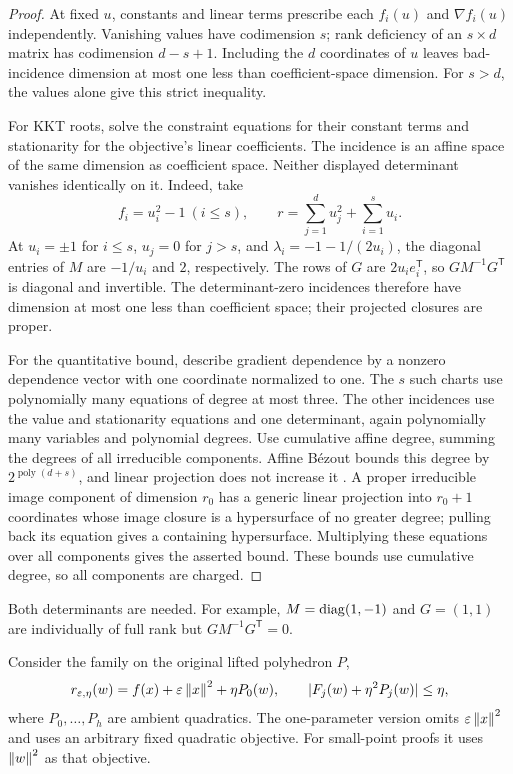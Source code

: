 \begin{proof}
At fixed $u$, constants and linear terms prescribe each $f_i(u)$ and
$\nabla f_i(u)$ independently. Vanishing values have codimension $s$;
rank deficiency of an $s\times d$ matrix has codimension $d-s+1$.
Including the $d$ coordinates of $u$ leaves bad-incidence dimension at most
one less than coefficient-space dimension. For $s>d$, the values alone
give this strict inequality.

For KKT roots, solve the constraint equations for their constant terms and
stationarity for the objective's linear coefficients. The incidence is an
affine space of the same dimension as coefficient space. Neither displayed
determinant vanishes identically on it. Indeed, take
\[
 f_i=u_i^2-1\ (i\le s),\qquad
 r=\sum_{j=1}^du_j^2+\sum_{i=1}^su_i.
\]
At $u_i=\pm1$ for $i\le s$, $u_j=0$ for $j>s$, and
$\lambda_i=-1-1/(2u_i)$, the diagonal entries of $M$ are $-1/u_i$ and
$2$, respectively. The rows of $G$ are $2u_ie_i^{\mathsf T}$, so
$GM^{-1}G^{\mathsf T}$ is diagonal and invertible. The determinant-zero
incidences therefore have dimension at most one less than coefficient
space; their projected closures are proper.

For the quantitative bound, describe gradient dependence by a nonzero
dependence vector with one coordinate normalized to one. The $s$ such
charts use polynomially many equations of degree at most three. The other
incidences use the value and stationarity equations and one determinant,
again polynomially many variables and polynomial degrees. Use cumulative
affine degree, summing the degrees of all irreducible components. Affine
B\'ezout bounds this degree by $2^{\operatorname{poly}(d+s)}$, and linear
projection does not increase it
\cite[Section~1.2.1]{KrickPardoSombra2001}. A proper irreducible image
component of dimension $r_0$ has a generic linear projection into $r_0+1$
coordinates whose image closure is a hypersurface of no greater degree;
pulling back its equation gives a containing hypersurface. Multiplying
these equations over all components gives the asserted bound. These bounds
use cumulative degree, so all components are charged.
\end{proof}

Both determinants are needed. For example, $M=\operatorname{diag}(1,-1)$ and $G=(1,1)$
are individually of full rank but $GM^{-1}G^{\mathsf T}=0$.

Consider the family on the original lifted polyhedron $P$,
\begin{equation}
\label{eq:ncq-perturbation}
 r_{\varepsilon,\eta}(w)=f(x)+\varepsilon\left\lVert x\right\rVert^2+\eta P_0(w),
 \qquad |F_j(w)+\eta^2P_j(w)|\le\eta,
\end{equation}
where $P_0,\ldots,P_h$ are ambient quadratics. The one-parameter version
omits $\varepsilon\left\lVert x\right\rVert^2$ and uses an arbitrary fixed quadratic
objective. For small-point proofs it uses $\left\lVert w\right\rVert^2$ as that objective.

